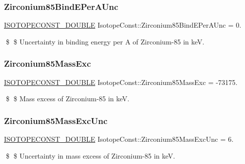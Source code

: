 \subsubsection{\texorpdfstring{Zirconium85\+Bind\+E\+Per\+A\+Unc}{Zirconium85BindEPerAUnc}}
{\footnotesize\ttfamily \mbox{\hyperlink{group___isotope_const-_macros_ga8f45a7272ce02c0b4c65c44636ed719a}{I\+S\+O\+T\+O\+P\+E\+C\+O\+N\+S\+T\+\_\+\+D\+O\+U\+B\+LE}} Isotope\+Const\+::\+Zirconium85\+Bind\+E\+Per\+A\+Unc = 0.}

\$ \$ Uncertainty in binding energy per A of Zirconium-\/85 in keV. \mbox{\label{group___isotope_const-_zirconium-_zr85_gac2de37709a6e6af1137e1f51984d8698}} 
\subsubsection{\texorpdfstring{Zirconium85\+Mass\+Exc}{Zirconium85MassExc}}
{\footnotesize\ttfamily \mbox{\hyperlink{group___isotope_const-_macros_ga8f45a7272ce02c0b4c65c44636ed719a}{I\+S\+O\+T\+O\+P\+E\+C\+O\+N\+S\+T\+\_\+\+D\+O\+U\+B\+LE}} Isotope\+Const\+::\+Zirconium85\+Mass\+Exc = -\/73175.}

\$ \$ Mass excess of Zirconium-\/85 in keV. \mbox{\label{group___isotope_const-_zirconium-_zr85_ga4718aff0a8a57b052d595223fe2a40e0}} 
\subsubsection{\texorpdfstring{Zirconium85\+Mass\+Exc\+Unc}{Zirconium85MassExcUnc}}
{\footnotesize\ttfamily \mbox{\hyperlink{group___isotope_const-_macros_ga8f45a7272ce02c0b4c65c44636ed719a}{I\+S\+O\+T\+O\+P\+E\+C\+O\+N\+S\+T\+\_\+\+D\+O\+U\+B\+LE}} Isotope\+Const\+::\+Zirconium85\+Mass\+Exc\+Unc = 6.}

\$ \$ Uncertainty in mass excess of Zirconium-\/85 in keV. \mbox{\label{group___isotope_const-_zirconium-_zr85_gab2d2977dfb51fd7471ba0bc0987049d8}} 
